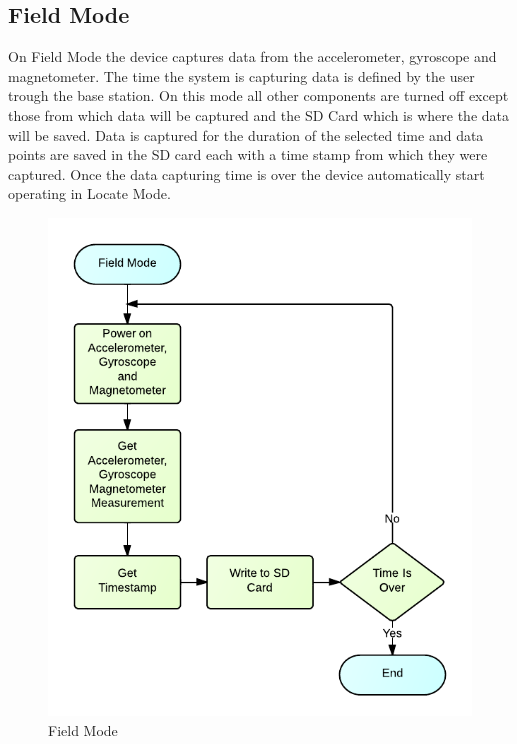 \subsection{Field Mode}
On Field Mode the device captures data from the accelerometer, gyroscope and magnetometer. The time the system is capturing data is defined by the user trough the base station. On this mode all other components are turned off except those from which data will be captured and the SD Card which is where the data will be saved. Data is captured for the duration of the selected time and data points are saved in the SD card each with a time stamp from which they were captured. Once the data capturing time is over the device automatically start operating in Locate Mode.
\begin{figure}[H]
	\centering
	\includegraphics[scale=1.0]{img/FieldMode}
	\caption{Field Mode \label{fig:fieldMode}}
\end{figure}

